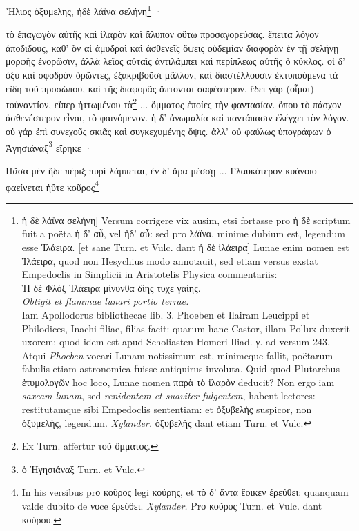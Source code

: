 \documentclass[a4paper, 11pt, oneside, polutonikogreek, german]{article}
\begin{document}
Ἥλιος ὀξυμελης, ἠδὲ λάϊνα σελήνη\footnote{ἡ δὲ λάϊνα σελήνη] Versum corrigere vix ausim, etsi fortasse pro ἡ δὲ scriptum fuit a poëta ἡ δ' αὖ, vel ἠδ' αὖ: sed pro λάϊνα, minime dubium est, legendum esse Ἱλάειρα. [et sane Turn. et Vulc. dant ἡ δὲ ἱλάειρα] Lunae enim nomen est Ἱλάειρα, quod non Hesychius modo annotauit, sed etiam versus exstat Empedoclis in Simplicii in Aristotelis Physica commentariis:\\\hspace*{5mm}Ἡ δὲ Φλὸξ Ἱλάειρα μίνυνθα δίης τυχε γαίης.\\\hspace*{5mm}\emph{Obtigit et flammae lunari portio terrae.}\\\hspace*{5mm}Iam Apollodorus bibliothecae lib. 3. Phoeben et Ilairam Leucippi et Philodices, Inachi filiae, filias facit: quarum hanc Castor, illam Pollux duxerit uxorem: quod idem est apud Scholiasten Homeri Iliad. γ. ad versum 243. Atqui \emph{Phoeben} vocari Lunam notissimum est, minimeque fallit, poëtarum fabulis etiam astronomica fuisse antiquirus involuta. Quid quod Plutarchus ἐτυμολογῶν hoc loco, Lunae nomen παρὰ τὸ ἱλαρὸν deducit? Non ergo iam \emph{saxeam lunam}, sed \emph{renidentem et suaviter fulgentem}, habent lectores: restitutamque sibi Empedoclis sententiam: et ὀξυβελὴς suspicor, non ὀξυμελὴς, legendum. \emph{Xylander.} ὀξυβελὴς dant etiam Turn. et Vulc.} ·

τὸ ἐπαγωγὸν αὐτῆς καὶ ἱλαρὸν καὶ ἄλυπον οὕτω προσαγορεύσας. ἔπειτα λόγον ἀποδιδους, καθ' ὃν αἱ ἀμυδραὶ καὶ ἀσθενεῖς ὄψεις οὐδεμίαν διαφορὰν ἐν τῇ σελήνῃ μορφῆς ἐνορῶσιν, ἀλλὰ λεῖος αὐταῖς ἀντιλάμπει καὶ περίπλεως αὐτῆς ὁ κύκλος. οἱ δ' ὀξὺ καὶ σφοδρὸν ὁρῶντες, ἐξακριβοῦσι μᾶλλον, καὶ διαστέλλουσιν ἐκτυπούμενα τὰ εἴδη τοῦ προσώπου, καὶ τῆς διαφορᾶς ἅπτονται σαφέστερον. ἔδει γὰρ (οἶμαι) τοὐναντίον, εἴπερ ἡττωμένου τὰ\footnote{Ex Turn. affertur τοῦ ὂμματος.} ... ὄμματος ἐποίες τὴν φαντασίαν. ὅπου τὸ πάσχον ἀσθενέστερον εἶναι, τὸ φαινόμενον. ἡ δ' ἀνωμαλία καὶ παντάπασιν ἐλέγχει τὸν λόγον. οὐ γάρ ἐπὶ συνεχοῦς σκιᾶς καὶ συγκεχυμένης ὄψις. ἀλλ' οὐ φαύλως ὑπογράφων ὁ Ἀγησιάναξ\footnote{ὁ Ἡγησιάναξ Turn. et Vulc.} εἴρηκε ·

Πᾶσα μὲν ἥδε πέριξ πυρὶ λάμπεται, ἐν δ' ἄρα μέσσῃ ... Γλαυκότερον κυάνοιο φαείνεται ἠΰτε κοῦρος\footnote{In his versibus prο κοῦρος legi κούρης, et τὸ δ' ἄντα ἔοικεν ἐρεύθει: quanquam valde dubito de νοce ἐρεύθει. \emph{Xylander.} Prο κοῦρος Turn. et Vulc. dant κούρου.}
\end{document}
